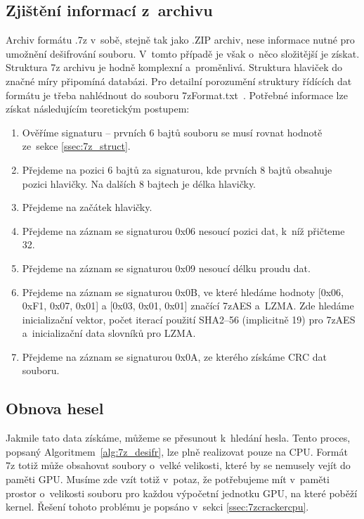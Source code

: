 \subsection{Zjištění informací z~archivu}
Archiv formátu .7z v~sobě, stejně tak jako .ZIP archiv, nese informace nutné pro umožnění
dešifrování souboru. V~tomto případě je však o~něco složitější je získat. Struktura 7z archivu
je hodně komplexní a~proměnlivá. Struktura hlaviček do značné míry připomíná databázi. Pro
detailní porozumění struktury řídících dat formátu je třeba nahlédnout do souboru
7zFormat.txt~\cite{Pavlov:2010}. Potřebné informace lze získat následujícím 
teoretickým postupem:
\begin{enumerate}
    \item Ověříme signaturu -- prvních 6 bajtů souboru se musí rovnat hodnotě ze~sekce \ref{ssec:7z_struct}. 
    \item Přejdeme na pozici 6 bajtů za signaturou, kde	prvních 8 bajtů obsahuje pozici hlavičky.
	Na dalších 8 bajtech je délka hlavičky.
    \item Přejdeme na začátek hlavičky.
    \item Přejdeme na záznam se signaturou 0x06 nesoucí pozici dat, k~níž přičteme 32.
    \item Přejdeme na záznam se signaturou 0x09 nesoucí délku proudu dat.
    \item Přejdeme na záznam se signaturou 0x0B, ve které hledáme hodnoty [0x06, 0xF1, 0x07, 0x01]
	a [0x03, 0x01, 0x01] značící 7zAES a~LZMA. Zde hledáme inicializační vektor, počet iterací použití SHA2--56 (implicitně
	19) pro 7zAES a~inicializační data slovníků pro LZMA.
    \item Přejdeme na záznam se signaturou 0x0A, ze kterého získáme CRC dat souboru.
\end{enumerate}

\subsection{Obnova hesel}
Jakmile tato data získáme, můžeme se přesunout k~hledání hesla. Tento proces, popsaný
Algoritmem~\ref{alg:7z_desifr}, lze plně realizovat pouze na CPU. Formát 7z totiž může obsahovat
soubory o~velké velikosti, které by se nemusely vejít do paměti GPU. Musíme zde vzít totiž
v~potaz, že potřebujeme mít v~paměti prostor o~velikosti souboru pro každou výpočetní jednotku GPU,
na které poběží kernel. Řešení tohoto problému je popsáno v~sekci \ref{ssec:7zcrackercpu}.

